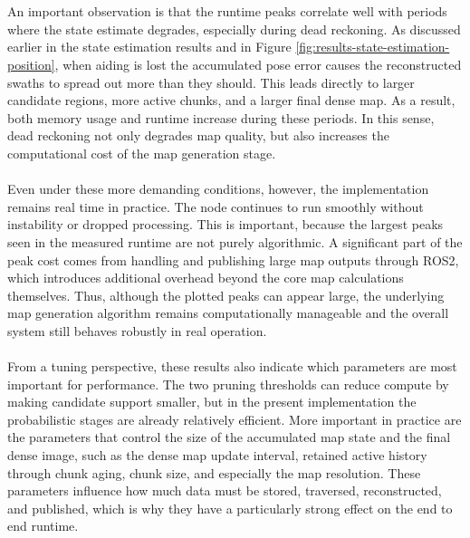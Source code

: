 \\ \\
An important observation is that the runtime peaks correlate well with periods where the state estimate degrades, especially during dead reckoning. As discussed earlier in the state estimation results and in Figure \ref{fig:results-state-estimation-position}, when aiding is lost the accumulated pose error causes the reconstructed swaths to spread out more than they should. This leads directly to larger candidate regions, more active chunks, and a larger final dense map. As a result, both memory usage and runtime increase during these periods. In this sense, dead reckoning not only degrades map quality, but also increases the computational cost of the map generation stage.
\\ \\
Even under these more demanding conditions, however, the implementation remains real time in practice. The node continues to run smoothly without instability or dropped processing. This is important, because the largest peaks seen in the measured runtime are not purely algorithmic. A significant part of the peak cost comes from handling and publishing large map outputs through ROS2, which introduces additional overhead beyond the core map calculations themselves. Thus, although the plotted peaks can appear large, the underlying map generation algorithm remains computationally manageable and the overall system still behaves robustly in real operation.
\\ \\
From a tuning perspective, these results also indicate which parameters are most important for performance. The two pruning thresholds can reduce compute by making candidate support smaller, but in the present implementation the probabilistic stages are already relatively efficient. More important in practice are the parameters that control the size of the accumulated map state and the final dense image, such as the dense map update interval, retained active history through chunk aging, chunk size, and especially the map resolution. These parameters influence how much data must be stored, traversed, reconstructed, and published, which is why they have a particularly strong effect on the end to end runtime.

\newpage

